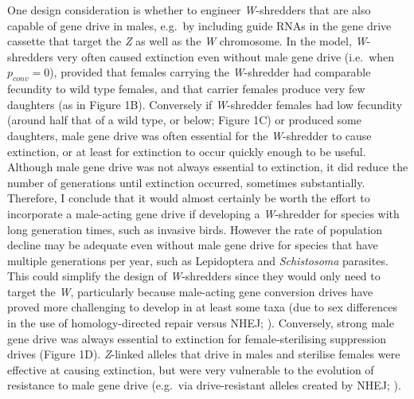 \documentclass[]{rsos}%
\begin{document}
One design consideration is whether to engineer \emph{W}-shredders that
are also capable of gene drive in males, e.g.~by including guide RNAs in
the gene drive cassette that target the \emph{Z} as well as the \emph{W}
chromosome. In the model, \emph{W}-shredders very often caused
extinction even without male gene drive (i.e.~when \(p_{conv} = 0\)),
provided that females carrying the \emph{W}-shredder had comparable
fecundity to wild type females, and that carrier females produce very
few daughters (as in Figure 1B). Conversely if \emph{W}-shredder females
had low fecundity (around half that of a wild type, or below; Figure 1C)
or produced some daughters, male gene drive was often essential for the
\emph{W}-shredder to cause extinction, or at least for extinction to
occur quickly enough to be useful. Although male gene drive was not
always essential to extinction, it did reduce the number of generations
until extinction occurred, sometimes substantially. Therefore, I
conclude that it would almost certainly be worth the effort to
incorporate a male-acting gene drive if developing a \emph{W}-shredder
for species with long generation times, such as invasive birds. However
the rate of population decline may be adequate even without male gene
drive for species that have multiple generations per year, such as
Lepidoptera and \emph{Schistosoma} parasites. This could simplify the
design of \emph{W}-shredders since they would only need to target the
\emph{W}, particularly because male-acting gene conversion drives have
proved more challenging to develop in at least some taxa (due to sex
differences in the use of homology-directed repair versus NHEJ;
\citep{grunwald2019super}). Conversely, strong male gene drive was
always essential to extinction for female-sterilising suppression drives
(Figure 1D). \emph{Z}-linked alleles that drive in males and sterilise
females were effective at causing extinction, but were very vulnerable
to the evolution of resistance to male gene drive (e.g.~via
drive-resistant alleles created by NHEJ; \citep{unckless2017ev}).
\end{document}
